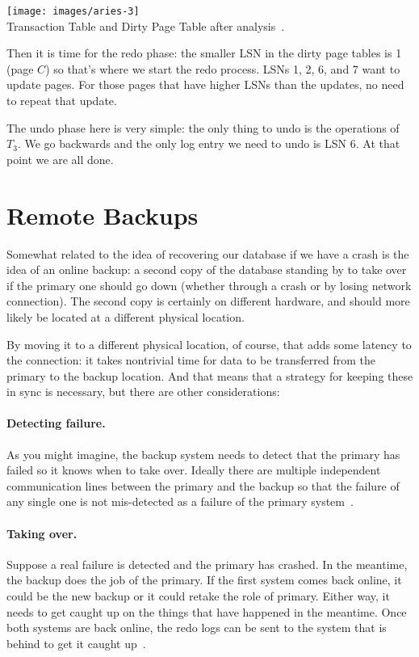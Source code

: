\begin{center}
\texttt{[image: images/aries-3]}\\
Transaction Table and Dirty Page Table after analysis~\cite{fds}.
\end{center}

Then it is time for the redo phase: the smaller LSN in the dirty page tables is 1 (page $C$) so that's where we start the redo process. LSNs 1, 2, 6, and 7 want to update pages. For those pages that have higher LSNs than the updates, no need to repeat that update.

The undo phase here is very simple: the only thing to undo is the operations of $T_{3}$. We go backwards and the only log entry we need to undo is LSN 6. At that point we are all done.


\section*{Remote Backups}

Somewhat related to the idea of recovering our database if we have a crash is the idea of an online backup: a second copy of the database standing by to take over if the primary one should go down (whether through a crash or by losing network connection). The second copy is certainly on different hardware, and should more likely be located at a different physical location. 

By moving it to a different physical location, of course, that adds some latency to the connection: it takes nontrivial time for data to be transferred from the primary to the backup location. And that means that a strategy for keeping these in sync is necessary, but there are other considerations:

\paragraph{Detecting failure.} As you might imagine, the backup system needs to detect that the primary has failed so it knows when to take over. Ideally there are multiple independent communication lines between the primary and the backup so that the failure of any single one is not mis-detected as a failure of the primary system~\cite{dsc}.

\paragraph{Taking over.} Suppose a real failure is detected and the primary has crashed. In the meantime, the backup does the job of the primary. If the first system comes back online, it could be the new backup or it could retake the role of primary. Either way, it needs to get caught up on the things that have happened in the meantime. Once both systems are back online, the redo logs can be sent to the system that is behind to get it caught up~\cite{dsc}.

